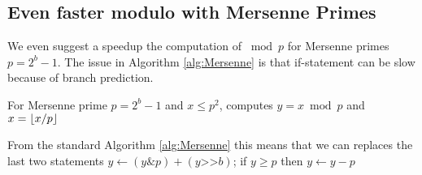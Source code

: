 \subsection{Even faster modulo with Mersenne Primes}
We even suggest a speedup the computation of $\bmod p$ for Mersenne primes
$p=2^b-1$. The issue in Algorithm \ref{alg:Mersenne} is that
if-statement can be slow because of branch prediction. 
\begin{algorithm}
  \caption{For Mersenne prime $p=2^b-1$ and $x\leq p^2$, computes
    $y=x\bmod p$ and $x=\lfloor {x/p} \rfloor$}
\end{algorithm}
From the standard Algorithm \ref{alg:Mersenne} this means that we can
replaces the last two statements
$y\gets (y\texttt\&p)+(y\texttt{>>}b)$;
if $y\geq p$ then {$y\gets y-p$}



